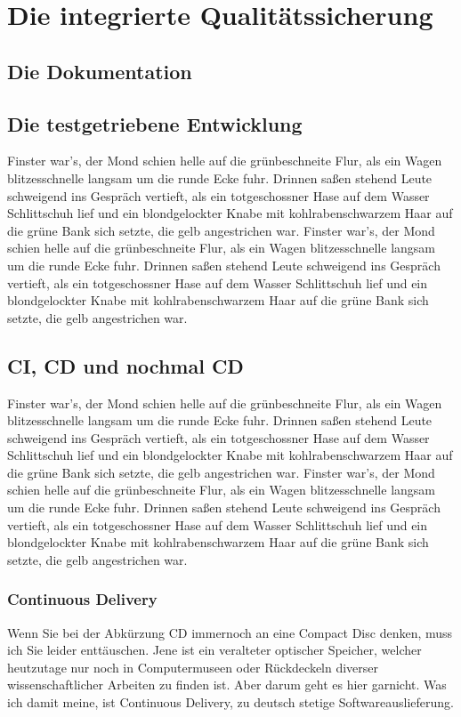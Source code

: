 \chapter{Die integrierte Qualitätssicherung}

\section{Die Dokumentation}

\section{Die testgetriebene Entwicklung}

Finster war's, der Mond schien helle auf die grünbeschneite Flur, als
ein Wagen blitzesschnelle langsam um die runde Ecke fuhr. Drinnen
saßen stehend Leute schweigend ins Gespräch vertieft, als ein
totgeschossner Hase auf dem Wasser Schlittschuh lief und ein
blondgelockter Knabe mit kohlrabenschwarzem Haar auf die grüne Bank
sich setzte, die gelb angestrichen war.
Finster war's, der Mond schien helle auf die grünbeschneite Flur, als
ein Wagen blitzesschnelle langsam um die runde Ecke fuhr. Drinnen
saßen stehend Leute schweigend ins Gespräch vertieft, als ein
totgeschossner Hase auf dem Wasser Schlittschuh lief und ein
blondgelockter Knabe mit kohlrabenschwarzem Haar auf die grüne Bank
sich setzte, die gelb angestrichen war.

\section{CI, CD und nochmal CD}
\label{sec:ci-cd-und-nochmal-cd}


Finster war's, der Mond schien helle auf die grünbeschneite Flur, als
ein Wagen blitzesschnelle langsam um die runde Ecke fuhr. Drinnen
saßen stehend Leute schweigend ins Gespräch vertieft, als ein
totgeschossner Hase auf dem Wasser Schlittschuh lief und ein
blondgelockter Knabe mit kohlrabenschwarzem Haar auf die grüne Bank
sich setzte, die gelb angestrichen war.
Finster war's, der Mond schien helle auf die grünbeschneite Flur, als
ein Wagen blitzesschnelle langsam um die runde Ecke fuhr. Drinnen
saßen stehend Leute schweigend ins Gespräch vertieft, als ein
totgeschossner Hase auf dem Wasser Schlittschuh lief und ein
blondgelockter Knabe mit kohlrabenschwarzem Haar auf die grüne Bank
sich setzte, die gelb angestrichen war.


\subsection{Continuous Delivery}
\label{subsec:continuous-delivery}
Wenn Sie bei der Abkürzung CD immernoch an eine Compact Disc denken, muss ich Sie leider enttäuschen. Jene ist ein veralteter optischer Speicher, welcher heutzutage nur noch in Computermuseen oder Rückdeckeln diverser wissenschaftlicher Arbeiten zu finden ist. Aber darum geht es hier garnicht. Was ich damit meine, ist Continuous Delivery, zu deutsch stetige Softwareauslieferung.


